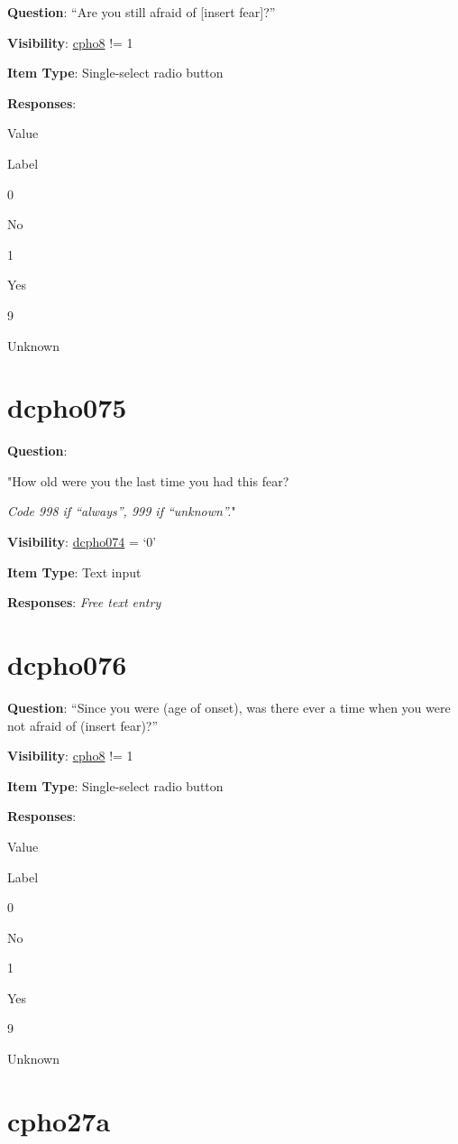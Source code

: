 \documentclass[]{book}
\begin{document}
\textbf{Question}: ``Are you still afraid of {[}insert fear{]}?''

\textbf{Visibility}: \protect\hyperlink{cpho8}{cpho8} != 1

\textbf{Item Type}: Single-select radio button

\textbf{Responses}:

Value

Label

0

No

1

Yes

9

Unknown

\hypertarget{dcpho075}{%
\section{dcpho075}\label{dcpho075}}

\textbf{Question}:

"How old were you the last time you had this fear?

\emph{Code 998 if ``always'', 999 if ``unknown''.}"

\textbf{Visibility}: \protect\hyperlink{dcpho074}{dcpho074} = `0'

\textbf{Item Type}: Text input

\textbf{Responses}: \emph{Free text entry}

\hypertarget{dcpho076}{%
\section{dcpho076}\label{dcpho076}}

\textbf{Question}: ``Since you were (age of onset), was there ever a time when you were not afraid of (insert fear)?''

\textbf{Visibility}: \protect\hyperlink{cpho8}{cpho8} != 1

\textbf{Item Type}: Single-select radio button

\textbf{Responses}:

Value

Label

0

No

1

Yes

9

Unknown

\hypertarget{cpho27a}{%
\section{cpho27a}\label{cpho27a}}
\end{document}
